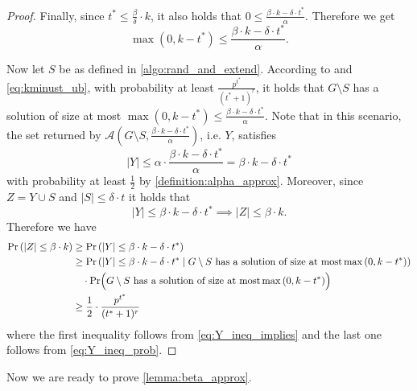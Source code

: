 \documentclass[letterpaper,11pt]{article}
\newcommand{\abs}[1]{{\left| #1\right|}}
\newcommand{\1}[1]{\mathds{1}\left[#1\right]}
\newcommand{\A}{{\mathcal{A}}}
\begin{document}
\begin{proof}
Finally, since $t^* \leq \frac{\beta}{\delta}\cdot k$, it also holds that $0 \leq \frac{\beta \cdot k - \delta \cdot t^*}{\alpha}$.
Therefore we get
\begin{equation}\label{eq:kminust_ub}
	\max\left( 0, k - t^* \right) \leq \frac{\beta \cdot k - \delta \cdot t^*}{\alpha}.
\end{equation}


	Now let $S$ be as defined in \cref{algo:rand_and_extend}.
	According to  and \eqref{eq:kminust_ub}, with probability at least $\frac{p^{t^*}}{(t^* + 1)^{r}}$, it holds that $G \setminus S$ has a solution of size at most $\max\left( 0, k - t^* \right) \leq \frac{\beta \cdot k - \delta \cdot t^*}{\alpha}$.
	Note that in this scenario, the set returned by $\A(G \setminus S, \frac{\beta \cdot k - \delta \cdot t^*}{\alpha})$, i.e. $Y$, satisfies
	\begin{equation}\label{eq:Y_ineq_prob}
		\abs{Y} \leq \alpha \cdot \frac{\beta \cdot k - \delta \cdot t^*}{\alpha} = \beta \cdot k - \delta \cdot t^*
	\end{equation}
	with probability at least $\frac{1}{2}$ by \cref{definition:alpha_approx}.
	Moreover, since $Z = Y \cup S$ and $\abs{S}  \leq \delta \cdot t$ it holds that
	\begin{equation}\label{eq:Y_ineq_implies}
		\abs{Y} \leq \beta \cdot k - \delta \cdot t^* \implies \abs{Z} \leq  \beta \cdot k.
	\end{equation}
	Therefore we have
	\begin{align*}
		\Pr\left( \abs{Z} \leq \beta \cdot k \right) &\geq \Pr\left( \abs{Y} \leq \beta \cdot k - \delta \cdot t^* \right)\\
							     &\geq \Pr\left(  \abs{Y} \leq \beta \cdot k - \delta \cdot t^*  \mid   G \setminus S \text{ has a solution of size at most} \max\left( 0, k - t^* \right) \right)\\
									&\quad \cdot \Pr\Bigl( G \setminus S \text{ has a solution of size at most} \max\left( 0, k - t^* \right) \Bigr) \\
									&\geq \frac{1}{2} \cdot \frac{p^{t^*}}{(t^* + 1)^{r}}
	\end{align*}
	where the first inequality follows from \eqref{eq:Y_ineq_implies} and the last one follows from \eqref{eq:Y_ineq_prob}.
\end{proof}

Now we are ready to prove \cref{lemma:beta_approx}.
\end{document}
